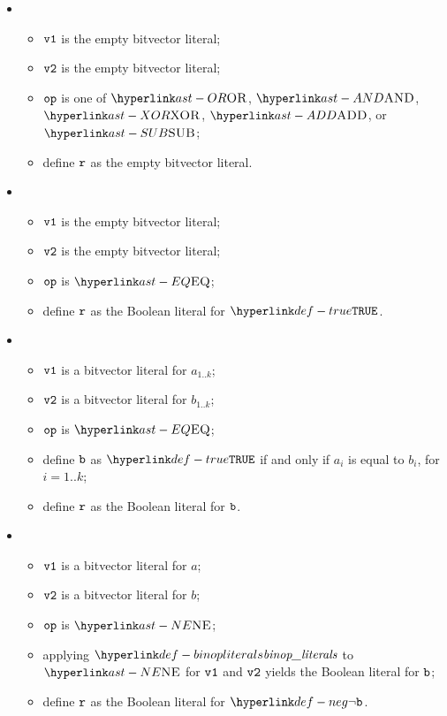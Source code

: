 \begin{itemize}
  \item {}
  \begin{itemize}
    \item $\texttt{v1}$ is the empty bitvector literal;
    \item $\texttt{v2}$ is the empty bitvector literal;
    \item $\texttt{op}$ is one of $\OR$, $\AND$, $\XOR$, $\ADD$, or $\SUB$;
    \item define $\texttt{r}$ as the empty bitvector literal.
  \end{itemize}

  \item {}
  \begin{itemize}
    \item $\texttt{v1}$ is the empty bitvector literal;
    \item $\texttt{v2}$ is the empty bitvector literal;
    \item $\texttt{op}$ is $\EQ$;
    \item define $\texttt{r}$ as the Boolean literal for $\True$.
  \end{itemize}

  \item {}
  \begin{itemize}
    \item $\texttt{v1}$ is a bitvector literal for $a_{1..k}$;
    \item $\texttt{v2}$ is a bitvector literal for $b_{1..k}$;
    \item $\texttt{op}$ is $\EQ$;
    \item define $\texttt{b}$ as $\True$ if and only if $a_i$ is equal to $b_i$, for $i=1..k$;
    \item define $\texttt{r}$ as the Boolean literal for $\texttt{b}$.
  \end{itemize}

  \item {}
  \begin{itemize}
    \item $\texttt{v1}$ is a bitvector literal for $a$;
    \item $\texttt{v2}$ is a bitvector literal for $b$;
    \item $\texttt{op}$ is $\NE$;
    \item applying $\binopliterals$ to $\NE$ for $\texttt{v1}$ and $\texttt{v2}$ yields the Boolean literal for $\texttt{b}$\ProseOrTypeError;
    \item define $\texttt{r}$ as the Boolean literal for $\neg\vb$.
  \end{itemize}


\end{itemize}
